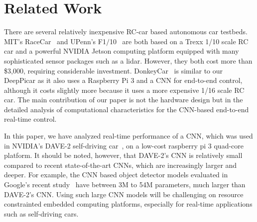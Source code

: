 \section{Related Work}\label{sec:related}


There are several relatively inexpensive RC-car based autonomous car
testbeds. MIT's RaceCar~\cite{shin2017project} and UPenn's
F1$/$10~\cite{upennf1tenth} are both based on a Trexx 1/10 scale RC
car and a powerful NVIDIA Jetson computing platform equipped with many
sophisticated sensor packages such as a lidar. However, they both cost
more than \$3,000, requiring considerable
investment. DonkeyCar~\cite{donkeycar} is similar to our DeepPicar as
it also uses a Raspberry Pi 3 and a CNN for end-to-end control,
although it costs slightly more because it uses a more expensive 1/16
scale RC car. The main contribution of our paper is not the hardware
design but in the detailed analysis of computational characteristics
for the CNN-based end-to-end real-time control.

In this paper, we have analyzed real-time performance of a CNN, which
was used in NVIDIA's DAVE-2 self-driving car~\cite{Bojarski2016}, on a 
low-cost raspberry pi 3 quad-core platform. It should be noted,
however, that DAVE-2's CNN is relatively small compared
to recent state-of-the-art CNNs, which are increasingly larger and
deeper. For example, the CNN based object detector models evaluated in
Google's recent study~\cite{huang2017speed} have between 3M to 54M
parameters, much larger than DAVE-2's CNN.
Using such large CNN models will be challenging on
resource constrainted embedded computing platforms, especially for
real-time applications such as self-driving cars.



